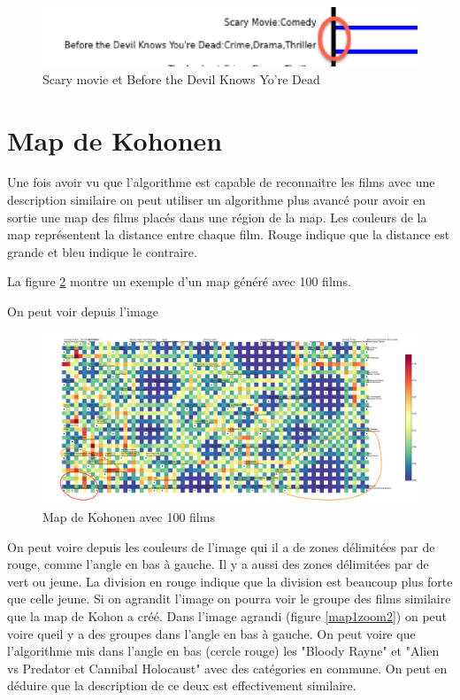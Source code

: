 		\begin{figure}[h]
			  \centering
			    \includegraphics[width=0.5\linewidth]{img/scarymovie.png}
			  \caption{Scary movie et Before the Devil Knows Yo're Dead}
			  \label{scarymovie}
			\end{figure}


	
\section{Map de Kohonen}

Une fois avoir vu que l'algorithme est capable de reconnaitre les films avec une description similaire on peut utiliser un algorithme plus avancé pour avoir en sortie une map des films placés dans une région de la map. Les couleurs de la map représentent la distance entre chaque film. Rouge indique que la distance est grande et bleu indique le contraire.

La figure \ref{map1} montre un exemple d'un map généré avec 100 films.

On peut voir depuis l'image
\begin{figure}[h]
	\centering
	\includegraphics[width=1\linewidth]{img/map-cluster.png}
	\caption{Map de Kohonen avec 100 films}
	\label{map1}
\end{figure}

On peut voire depuis les couleurs de l'image qui il a de zones délimitées par de rouge, comme l'angle en bas à gauche. Il y a aussi des zones délimitées par de vert ou jeune. La division en rouge indique que la division est beaucoup plus forte que celle jeune. Si on agrandit l'image on pourra voir le groupe des films similaire que la map de Kohon a créé.
Dans l'image agrandi (figure \ref{map1zoom2}) on peut voire queil y a des groupes dans l'angle en bas à gauche. On peut voire que l'algorithme mis dans l'angle en bas (cercle rouge) les "Bloody Rayne" et "Alien vs Predator et Cannibal Holocaust" avec des catégories en commune. On peut en déduire que la description de ce deux est effectivement similaire.

